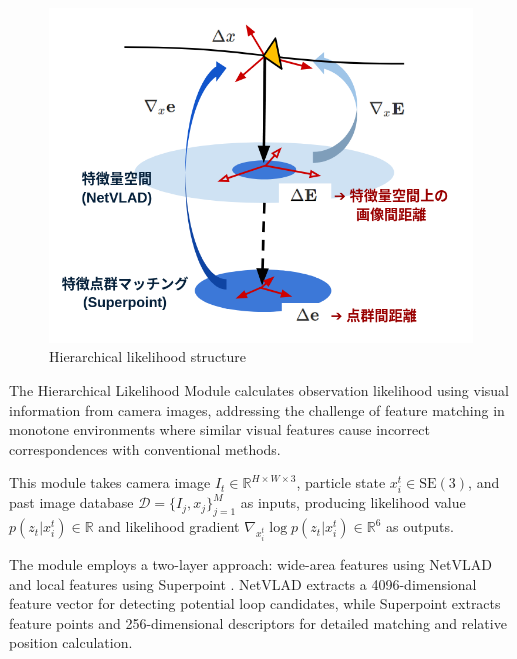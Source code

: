 \documentclass[a4paper,fleqn,10pt,twocolumn]{SICE_ISCS}
\begin{document}
\begin{figure}[t]
	\begin{center}
		\includegraphics[width=\linewidth]{Fig/likelihood.png}
		\caption{Hierarchical likelihood structure}
		\label{fig:likelihood}
	\end{center}
	\vspace{-2mm}
\end{figure}

The Hierarchical Likelihood Module calculates observation likelihood using visual information from camera images, addressing the challenge of feature matching in monotone environments where similar visual features cause incorrect correspondences with conventional methods.

This module takes camera image $I_t \in \mathbb{R}^{H \times W \times 3}$, particle state $x_i^t \in \mathrm{SE}(3)$, and past image database $\mathcal{D} = \{I_j, x_j\}_{j=1}^M$ as inputs, producing likelihood value $p(z_t | x_i^t) \in \mathbb{R}$ and likelihood gradient $\nabla_{x_i^t} \log p(z_t | x_i^t) \in \mathbb{R}^6$ as outputs.

The module employs a two-layer approach: wide-area features using NetVLAD \cite{Arandjelovic2016} and local features using Superpoint \cite{DeTone2018}. NetVLAD extracts a 4096-dimensional feature vector for detecting potential loop candidates, while Superpoint extracts feature points and 256-dimensional descriptors for detailed matching and relative position calculation.
\end{document}

